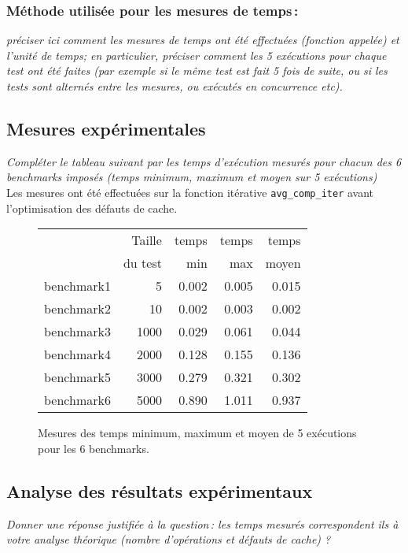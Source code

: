 \documentclass[a4paper, 10pt, french]{article}
\begin{document}
	\subsubsection{Méthode utilisée pour les mesures de temps\,: } 
	  {\em préciser ici  comment les mesures de temps ont été effectuées (fonction appelée) et l'unité de temps; en particulier, 
	   préciser comment les 5 exécutions pour chaque test ont été faites (par exemple si le même test est fait 5 fois de suite, ou si les tests sont alternés entre
	   les mesures, ou exécutés en concurrence etc). 
	  }

  \subsection{Mesures expérimentales}
	{\em Compléter le tableau suivant par les temps d'exécution mesurés pour chacun des 6 benchmarks imposés
			  (temps minimum, maximum et moyen sur 5 exécutions)
	}\\
	{Les mesures ont été effectuées sur la fonction itérative \verb?avg_comp_iter? avant l'optimisation des défauts de cache.}

	\begin{figure}[h]
		\begin{center}
			\begin{tabular}{|l||r||r|r|r||}
				\hline
				\hline
				& Taille         & temps     & temps   & temps \\
				& du test     & min       & max     & moyen \\
				\hline
				\hline
				benchmark1 & 5   & 0.002     & 0.005   & 0.015 \\
				\hline
				benchmark2 & 10  & 0.002     & 0.003   & 0.002 \\
				\hline
				benchmark3 & 1000  & 0.029     & 0.061   & 0.044 \\
				\hline
				benchmark4 & 2000  & 0.128    & 0.155    & 0.136 \\
				\hline
				benchmark5 & 3000  & 0.279    & 0.321    & 0.302 \\
				\hline
				benchmark6 & 5000  & 0.890    & 1.011    & 0.937 \\
				\hline
				\hline
			\end{tabular}
			\caption{Mesures des temps minimum, maximum et moyen de 5 exécutions pour les 6 benchmarks.}
			\label{table-temps}
		\end{center}
	\end{figure}

\subsection{Analyse des résultats expérimentaux}
{\em Donner  une réponse justifiée  à la question\,: 
			  les  temps mesurés correspondent ils  à votre analyse théorique (nombre d’opérations et défauts de cache) ?
}
\end{document}
